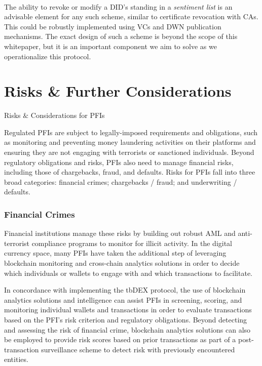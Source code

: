 \documentclass[11pt]{article}
\begin{document}
 \\ The ability to revoke or modify a DID’s standing in a \textit{sentiment list} is an advisable element for any such scheme, similar to certificate revocation with CAs. This could be robustly implemented using VCs and DWN publication mechanisms. The exact design of such a scheme is beyond the scope of this whitepaper, but it is an important component we aim to solve as we operationalize this protocol.

\vspace{1\baselineskip}
\section{Risks & Further Considerations}

\vspace{1\baselineskip}
{\LARGE Risks $\&$ Considerations for PFIs}

\vspace{1\baselineskip}
Regulated PFIs are subject to legally-imposed requirements and obligations, such as monitoring and preventing money laundering activities on their platforms and ensuring they are not engaging with terrorists or sanctioned individuals. Beyond regulatory obligations and risks, PFIs also need to manage financial risks, including those of chargebacks, fraud, and defaults.  Risks for PFIs fall into three broad categories: financial crimes; chargebacks / fraud; and underwriting / defaults.

\subsubsection{Financial Crimes}

Financial institutions manage these risks by building out robust AML and anti-terrorist compliance programs to monitor for illicit activity. In the digital currency space, many PFIs have taken the additional step of leveraging blockchain monitoring and cross-chain analytics solutions in order to decide which individuals or wallets to engage with and which transactions to facilitate.

\vspace{1\baselineskip}
In concordance with implementing the tbDEX protocol, the use of blockchain analytics solutions and intelligence can assist PFIs in screening, scoring, and monitoring individual wallets and transactions in order to evaluate transactions based on the PFI’s risk criterion and regulatory obligations. Beyond detecting and assessing the risk of financial crime, blockchain analytics solutions can also be employed to provide risk scores based on prior transactions as part of a post-transaction surveillance scheme to detect risk with previously encountered entities. 
\end{document}
